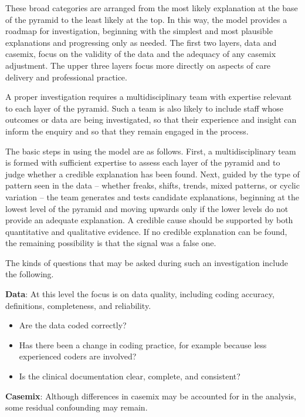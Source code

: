 \documentclass[
]{book}
\providecommand{\tightlist}{%
  \setlength{\itemsep}{0pt}\setlength{\parskip}{0pt}}
\begin{document}
These broad categories are arranged from the most likely explanation at the base of the pyramid to the least likely at the top. In this way, the model provides a roadmap for investigation, beginning with the simplest and most plausible explanations and progressing only as needed. The first two layers, data and casemix, focus on the validity of the data and the adequacy of any casemix adjustment. The upper three layers focus more directly on aspects of care delivery and professional practice.

A proper investigation requires a multidisciplinary team with expertise relevant to each layer of the pyramid. Such a team is also likely to include staff whose outcomes or data are being investigated, so that their experience and insight can inform the enquiry and so that they remain engaged in the process.

The basic steps in using the model are as follows. First, a multidisciplinary team is formed with sufficient expertise to assess each layer of the pyramid and to judge whether a credible explanation has been found. Next, guided by the type of pattern seen in the data -- whether freaks, shifts, trends, mixed patterns, or cyclic variation -- the team generates and tests candidate explanations, beginning at the lowest level of the pyramid and moving upwards only if the lower levels do not provide an adequate explanation. A credible cause should be supported by both quantitative and qualitative evidence. If no credible explanation can be found, the remaining possibility is that the signal was a false one.

The kinds of questions that may be asked during such an investigation include the following.

\textbf{Data}: At this level the focus is on data quality, including coding accuracy, definitions, completeness, and reliability.

\begin{itemize}
\tightlist
\item
  Are the data coded correctly?
\item
  Has there been a change in coding practice, for example because less experienced coders are involved?
\item
  Is the clinical documentation clear, complete, and consistent?
\end{itemize}

\textbf{Casemix}: Although differences in casemix may be accounted for in the analysis, some residual confounding may remain.
\end{document}

